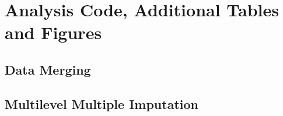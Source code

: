 \chapter{Analysis Code, Additional Tables and Figures}

\section{Data Merging}\label{R.reimport}

\begin{singlespacing}
    
\end{singlespacing}





\section{Multilevel Multiple Imputation}\label{sec:MMI}

\begin{singlespacing}
    
\end{singlespacing}

\begin{singlespacing}
    
\end{singlespacing}



